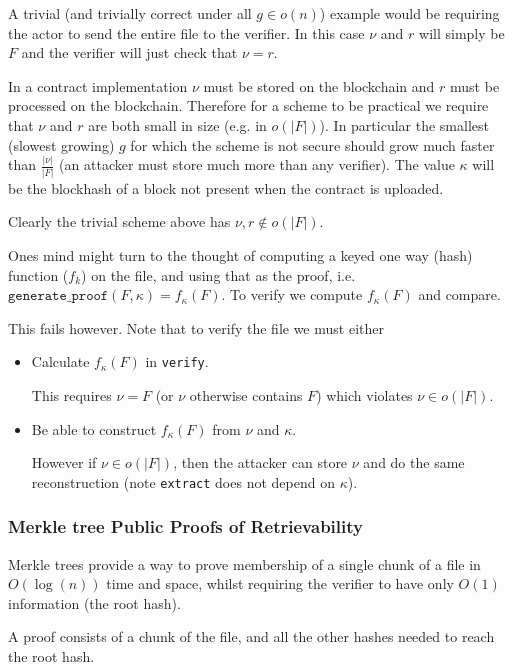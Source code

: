 \documentclass[10pt,twoside,a4paper]{article}
\begin{document}
A trivial (and trivially correct under all $g \in o(n)$) example would be requiring the actor to send the entire file to the verifier.
In this case $\nu$ and $r$ will simply be $F$ and the verifier will just check that $\nu = r$.

In a contract implementation $\nu$ must be stored on the blockchain
and $r$ must be processed on the blockchain.
Therefore for a scheme to be practical we require that $\nu$ and $r$ are both small in size (e.g. in $o(|F|)$).
In particular the smallest (slowest growing) $g$ for which the scheme is not secure should grow much faster than $\frac{|\nu|}{|F|}$
(an attacker must store much more than any verifier).
The value $\kappa$ will be the blockhash of a block not present when the contract is uploaded.

Clearly the trivial scheme above has $\nu, r \not\in o(|F|)$.

Ones mind might turn to the thought of computing a keyed one way (hash) function ($f_k$) on the file, and using that as the proof,
i.e. $\texttt{generate\_proof}(F, \kappa) = f_\kappa(F)$. To verify we compute $f_\kappa(F)$ and compare.

This fails however.
Note that to verify the file we must either
\begin{itemize}
\item Calculate $f_\kappa(F)$ in \texttt{verify}.

This requires $\nu = F$ (or $\nu$ otherwise contains $F$) which violates $\nu \in o(|F|)$.
\item Be able to construct $f_\kappa(F)$ from $\nu$ and $\kappa$.

However if $\nu \in o(|F|)$, then the attacker can store $\nu$ and do the same reconstruction (note \texttt{extract} does not depend on $\kappa$).
\end{itemize}




\subsubsection{Merkle tree Public Proofs of Retrievability}

Merkle trees provide a way to prove membership of a single chunk of a file in $O(\log(n))$ time and space,
whilst requiring the verifier to have only $O(1)$ information (the root hash).

A proof consists of a chunk of the file, and all the other hashes needed to reach the root hash.
\end{document}
